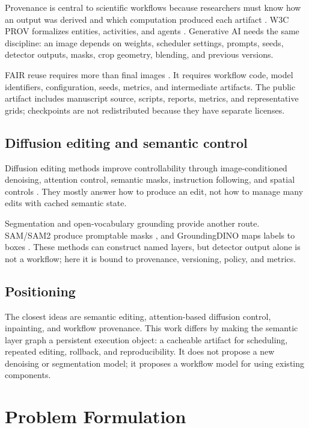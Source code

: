 \documentclass[final,5p,times,number,sort&compress]{elsarticle}
\begin{document}
Provenance is central to scientific workflows because researchers must know how an output was derived and which computation produced each artifact \citep{davidson2008provenance}. W3C PROV formalizes entities, activities, and agents \citep{moreau2013prov}. Generative AI needs the same discipline: an image depends on weights, scheduler settings, prompts, seeds, detector outputs, masks, crop geometry, blending, and previous versions.

FAIR reuse requires more than final images \citep{wilkinson2016fair}. It requires workflow code, model identifiers, configuration, seeds, metrics, and intermediate artifacts. The public artifact includes manuscript source, scripts, reports, metrics, and representative grids; checkpoints are not redistributed because they have separate licenses.

\subsection{Diffusion editing and semantic control}

Diffusion editing methods improve controllability through image-conditioned denoising, attention control, semantic masks, instruction following, and spatial controls \citep{meng2022sdedit,hertz2023prompt,couairon2023diffedit,brooks2023instructpix2pix,zhang2023controlnet}. They mostly answer how to produce an edit, not how to manage many edits with cached semantic state.

Segmentation and open-vocabulary grounding provide another route. SAM/SAM2 produce promptable masks \citep{kirillov2023sam,ravi2024sam2}, and GroundingDINO maps labels to boxes \citep{liu2023groundingdino}. These methods can construct named layers, but detector output alone is not a workflow; here it is bound to provenance, versioning, policy, and metrics.

\subsection{Positioning}

The closest ideas are semantic editing, attention-based diffusion control, inpainting, and workflow provenance. This work differs by making the semantic layer graph a persistent execution object: a cacheable artifact for scheduling, repeated editing, rollback, and reproducibility. It does not propose a new denoising or segmentation model; it proposes a workflow model for using existing components.

\section{Problem Formulation}
\end{document}
